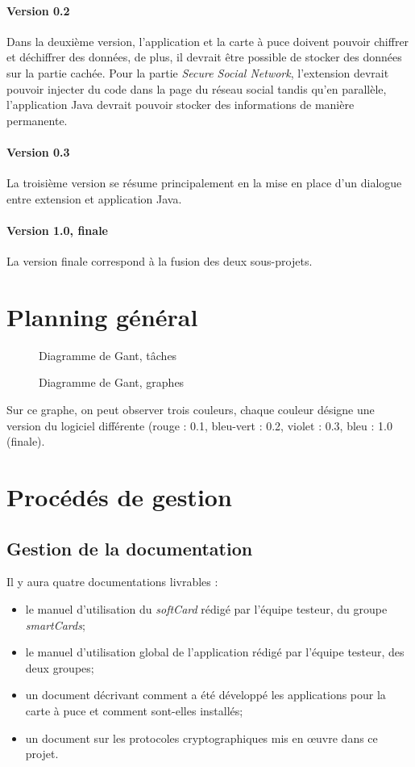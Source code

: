 \documentclass[a4paper,11pt,french]{article}
\begin{document}
\paragraph{Version 0.2}  
Dans la deuxième version, l'application et la carte à puce doivent pouvoir
chiffrer et déchiffrer des données, de plus, il devrait être possible
de stocker des données sur la partie cachée. Pour la partie 
\emph{Secure Social Network}, l'extension devrait pouvoir injecter
du code dans la page du réseau social tandis qu'en parallèle, l'application
Java devrait pouvoir stocker des informations de manière permanente.

\paragraph{Version 0.3}
La troisième version se résume principalement en la mise en place
d'un dialogue entre extension et application Java.

\paragraph{Version 1.0, finale} 
La version finale correspond à la fusion des deux sous-projets.

\section{Planning général}
\begin{center}
\begin{figure}[h]
\caption{Diagramme de Gant, tâches}
\end{figure}
\begin{figure}[h]
\caption{Diagramme de Gant, graphes}
\end{figure}
\end{center}
Sur ce graphe, on peut observer trois couleurs, chaque couleur désigne une
version du logiciel différente (rouge : 0.1, bleu-vert : 0.2, violet : 0.3, bleu : 1.0
(finale).
\section{Procédés de gestion}

\subsection{Gestion de la documentation}
Il y aura quatre documentations livrables : 
\begin{itemize}
 \item le manuel d'utilisation du \emph{softCard} rédigé par l'équipe testeur,
 du groupe \emph{smartCards};
 \item le manuel d'utilisation global de l'application rédigé par l'équipe 
 testeur, des deux groupes;
 \item un document décrivant comment a été développé les applications pour
 la carte à puce et comment sont-elles installés;
 \item un document sur les protocoles cryptographiques mis en \oe{}uvre
 dans ce projet.
\end{itemize}
\end{document}
